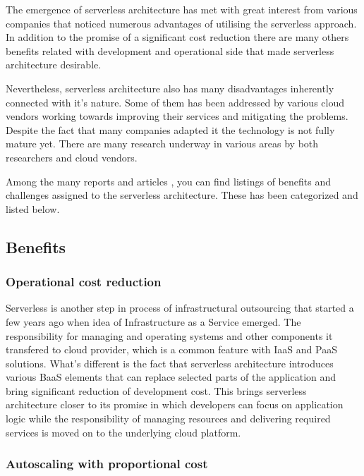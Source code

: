 The emergence of serverless architecture has met with great interest from various companies that noticed numerous advantages of utilising the serverless approach. In addition to the promise of a significant cost reduction there are many others benefits related with development and operational side that made serverless architecture desirable. 

Nevertheless, serverless architecture also has many disadvantages inherently connected with it's nature. Some of them has been addressed by various cloud vendors working towards improving their services and mitigating the problems. Despite the fact that many companies adapted it the technology is not fully mature yet. There are many research underway in various areas by both researchers and cloud vendors.

Among the many reports and articles \cite{MartinFowlerServerless} \cite{BerkeleyServerless}, you can find listings of benefits and challenges assigned to the serverless architecture. These has been categorized and listed below.

\subsection{Benefits}

\subsubsection*{Operational cost reduction}

Serverless is another step in process of infrastructural outsourcing that started a few years ago when idea of Infrastructure as a Service emerged. 
The responsibility for managing and operating systems and other components it transfered to cloud provider, which is a common feature with IaaS and PaaS solutions.
What's different is the fact that serverless architecture introduces various BaaS elements that can replace selected parts of the application and bring significant reduction of development cost.
This brings serverless architecture closer to its promise in which developers can focus on application logic while the responsibility of managing resources and delivering required services is moved on to the underlying cloud platform.

\subsubsection*{Autoscaling with proportional cost}

